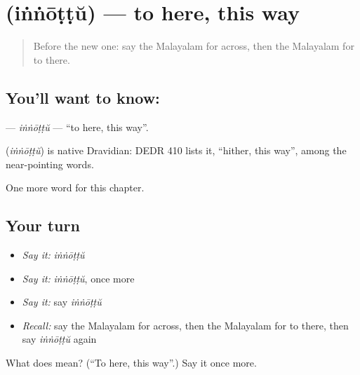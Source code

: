 \section[\texorpdfstring{\ml{ഇങ്ങോട്ട്} (iṅṅōṭṭŭ)}{ഇങ്ങോട്ട് (iṅṅōṭṭŭ)}]{ (iṅṅōṭṭŭ) — to here, this way}

\label{lesson:ML-C240-innottu}



\begin{quote}
Before the new one: say the Malayalam for across, then the Malayalam for to there.
\end{quote}

\subsection*{You'll want to know: }
\textbf{} — \emph{iṅṅōṭṭŭ} — \textquotedblleft{}to here, this way\textquotedblright{}.

\begin{cousinweb}
\textbf{} (\emph{iṅṅōṭṭŭ}) is native Dravidian: DEDR 410 lists it, \textquotedblleft{}hither, this way\textquotedblright{}, among the near-pointing words.
\end{cousinweb}

\begin{grammarlens}[title={What you've built}]
One more word for this chapter.
\end{grammarlens}

\subsection*{Your turn}
\begin{itemize}
\raggedright
  \item \emph{Say it:} \emph{iṅṅōṭṭŭ}
  \item \emph{Say it:} \emph{iṅṅōṭṭŭ}, once more
  \item \emph{Say it:} say \emph{iṅṅōṭṭŭ}
  \item \emph{Recall:} say the Malayalam for across, then the Malayalam for to there, then say \emph{iṅṅōṭṭŭ} again
\end{itemize}

\begin{tcolorbox}[breakable,colback=teal!4,colframe=teal!35!black,title={Before you move on}]
What does  mean? (\textquotedblleft{}To here, this way\textquotedblright{}.) Say it once more.
\end{tcolorbox}
